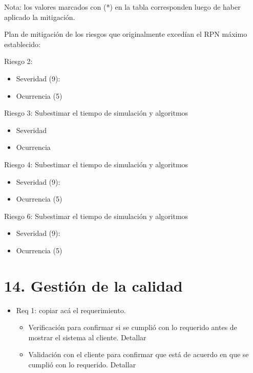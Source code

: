 \documentclass[
11pt, %
]{charter}
\begin{document}
Nota: los valores marcados con (*) en la tabla corresponden luego de haber aplicado la
mitigación.

Plan de mitigación de los riesgos que originalmente excedían el RPN máximo establecido:


Riesgo 2:  %
\begin{itemize}
	\item Severidad (9):
	\newline 
	\item Ocurrencia (5)\newline 

\end{itemize}


Riesgo 3:  Subestimar el tiempo de simulación y algoritmos
\begin{itemize}
	\item Severidad 
	\newline 
	\item Ocurrencia\newline 

\end{itemize}


Riesgo 4:  Subestimar el tiempo de simulación y algoritmos
\begin{itemize}
	\item Severidad (9):
	\newline 
	\item Ocurrencia (5)\newline 
\end{itemize}

Riesgo 6:  Subestimar el tiempo de simulación y algoritmos
\begin{itemize}
	\item Severidad (9):
	\newline 
	\item Ocurrencia (5)\newline 
\end{itemize}




\section{14. Gestión de la calidad}
\label{sec:calidad}

\begin{itemize} 
	\item Req 1: copiar acá el requerimiento.
	
	\begin{itemize}
		\item Verificación para confirmar si se cumplió con lo requerido antes de mostrar el sistema al cliente. Detallar 
		\item Validación con el cliente para confirmar que está de acuerdo en que se cumplió con lo requerido. Detallar  
	\end{itemize}
	
\end{itemize}
\end{document}
